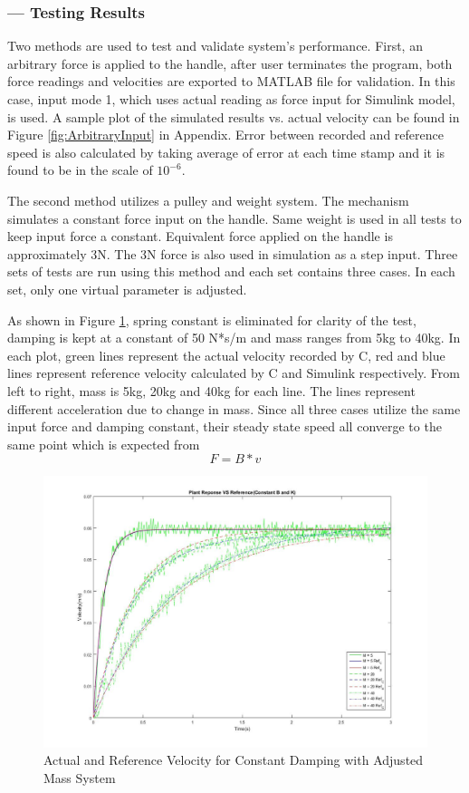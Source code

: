 \subsubsection*{ --- Testing Results}
Two methods are used to test and validate system's performance. First, an arbitrary force is applied to the handle, after user terminates the program, both force readings and velocities are exported to MATLAB file for validation. In this case, input mode 1, which uses actual reading as force input for Simulink model, is used. A sample plot of the simulated results vs. actual velocity can be found in Figure \ref{fig:ArbitraryInput} in Appendix. Error between recorded and reference speed is also calculated by taking average of error at each time stamp and it is found to be in the scale of $10^{-6}$. 

The second method utilizes a pulley and weight system. The mechanism simulates a constant force input on the handle. Same weight is used in all tests to keep input force a constant. Equivalent force applied on the handle is approximately 3N. The 3N force is also used in simulation as a step input. Three sets of tests are run using this method and each set contains three cases. In each set, only one virtual parameter is adjusted. 

As shown in Figure \ref{fig:MChange}, spring constant is eliminated for clarity of the test, damping is kept at a constant of 50 N*s/m and mass ranges from 5kg to 40kg. In each plot, green lines represent the actual velocity recorded by C, red and blue lines represent reference velocity calculated by C and Simulink respectively. From left to right, mass is 5kg, 20kg and 40kg for each line. The lines represent different acceleration due to change in mass.  Since all three cases utilize the same input force and damping constant, their steady state speed all converge to the same point which is expected from 
\begin{equation}
F=B*v
\end{equation}
\begin{figure}[H]
\centering
\includegraphics[width=1\linewidth]{Images/MChange}
\caption{Actual and Reference Velocity for Constant Damping with Adjusted Mass System}
\label{fig:MChange}
\end{figure}

